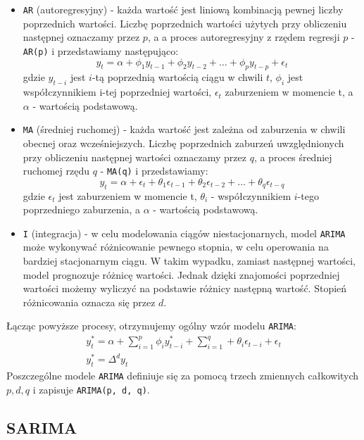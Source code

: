 \documentclass[12pt]{article}
\begin{document}
\begin{itemize}
    \item \texttt{AR} (autoregresyjny) - każda wartość jest liniową kombinacją pewnej liczby poprzednich wartości. Liczbę poprzednich wartości użytych przy obliczeniu następnej oznaczamy przez $p$, a a proces autoregresyjny z rzędem regresji $p$ - \texttt{AR(p)} i przedstawiamy następująco:
    \[
        y_t = \alpha + \phi_1y_{t-1} + \phi_2y_{t-2} + \dots + \phi_py_{t-p} + \epsilon_t
    \]
    gdzie $y_{t-i}$ jest $i$-tą poprzednią wartością ciągu w chwili $t$, $\phi_i$ jest współczynnikiem i-tej poprzedniej wartości, $\epsilon_t$ zaburzeniem w momencie t, a $\alpha$ - wartością podstawową.
    \item \texttt{MA} (średniej ruchomej) - każda wartość jest zależna od zaburzenia w chwili obecnej oraz wcześniejszych. Liczbę poprzednich zaburzeń uwzględnionych przy obliczeniu następnej wartości oznaczamy przez $q$, a proces średniej ruchomej rzędu $q$ - \texttt{MA(q)} i przedstawiamy:
    \[
        y_t = \alpha + \epsilon_t + \theta_1\epsilon_{t-1} + \theta_2\epsilon_{t-2} + \dots + \theta_q\epsilon_{t-q}
    \]
    gdzie $\epsilon_t$ jest zaburzeniem w momencie t, $\theta_i$ - współczynnikiem $i$-tego poprzedniego zaburzenia, a $\alpha$ - wartością podstawową.
    \item \texttt{I} (integracja) - w celu modelowania ciągów niestacjonarnych, model \texttt{ARIMA} może wykonywać różnicowanie pewnego stopnia, w celu operowania na bardziej stacjonarnym ciągu. W takim wypadku, zamiast następnej wartości, model prognozuje różnicę wartości. Jednak dzięki znajomości poprzedniej wartości możemy wyliczyć na podstawie różnicy następną wartość. Stopień różnicowania oznacza się przez $d$.
\end{itemize}

Łącząc powyższe procesy, otrzymujemy ogólny wzór modelu \texttt{ARIMA}:
\begin{gather*}
    y_t^* = \alpha + \sum^p_{i=1}\phi_iy^*_{t-i} + \sum^q_{i=1} + \theta_i\epsilon_{t-i} + \epsilon_t \\
    y_t^* = \Delta^dy_t
\end{gather*}
Poszczególne modele \texttt{ARIMA} definiuje się za pomocą trzech zmiennych całkowitych $p, d, q$ i zapisuje \texttt{ARIMA(p, d, q)}.

\subsection{SARIMA}
\end{document}
